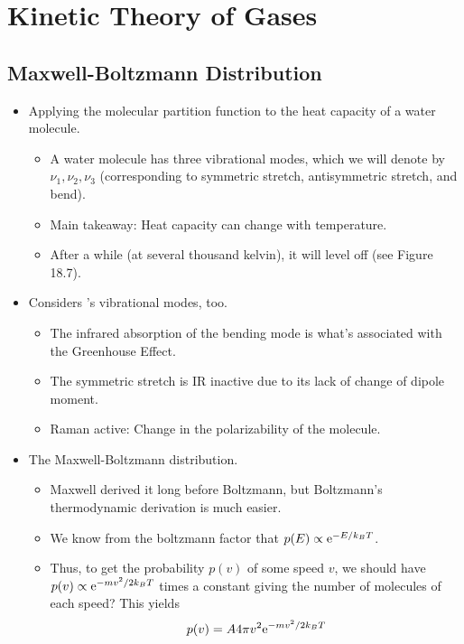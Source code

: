 \documentclass[../notes.tex]{subfiles}
\begin{document}
\chapter{Kinetic Theory of Gases}
\section{Maxwell-Boltzmann Distribution}
\begin{itemize}
    \item {}Applying the molecular partition function to the heat capacity of a water molecule.
    \begin{itemize}
        \item A water molecule has three vibrational modes, which we will denote by $\nu_1,\nu_2,\nu_3$ (corresponding to symmetric stretch, antisymmetric stretch, and bend).
        \item Main takeaway: Heat capacity can change with temperature.
        \item After a while (at several thousand kelvin), it will level off (see Figure 18.7).
    \end{itemize}
    \item Considers 's vibrational modes, too.
    \begin{itemize}
        \item The infrared absorption of the bending mode is what's associated with the Greenhouse Effect.
        \item The symmetric stretch is IR inactive due to its lack of change of dipole moment.
        \item Raman active: Change in the polarizability of the molecule.
    \end{itemize}
    \item The Maxwell-Boltzmann distribution.
    \begin{itemize}
        \item Maxwell derived it long before Boltzmann, but Boltzmann's thermodynamic derivation is much easier.
        \item We know from the boltzmann factor that $p(E)\propto\e[-E/k_BT]$.
        \item Thus, to get the probability $p(v)$ of some speed $v$, we should have $p(v)\propto\e[-mv^2/2k_BT]$ times a constant giving the number of molecules of each speed? This yields
        \begin{equation*}
            p(v) = A4\pi v^2\e[-mv^2/2k_BT]
        \end{equation*}

\end{itemize}
\end{itemize}
\end{document}
